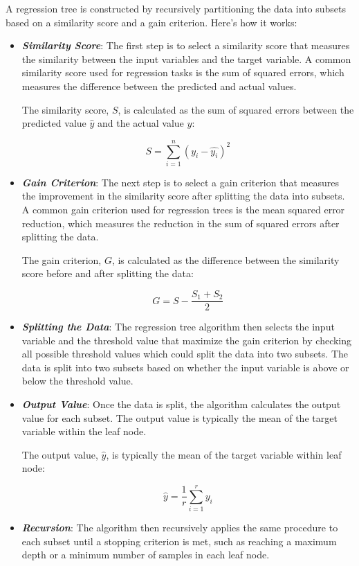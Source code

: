 \documentclass{article}
\begin{document}
\vspace{1em}
A regression tree is constructed by recursively partitioning the data into subsets based on a similarity score and a gain criterion. Here's how it works:

\begin{itemize}
	\item \textbf{\textit{Similarity Score}}: The first step is to select a similarity score that measures the similarity between the input variables and the target variable. A common similarity score used for regression tasks is the sum of squared errors, which measures the difference between the predicted and actual values.
	
	The similarity score, $S$, is calculated as the sum of squared errors between the predicted value $\hat{y}$ and the actual value $y$:
	
	$$ S = \sum_{i=1}^{n} ( y_i - \hat{y_i})^2 $$
	
	\item \textit{\textbf{Gain Criterion}}: The next step is to select a gain criterion that measures the improvement in the similarity score after splitting the data into subsets. A common gain criterion used for regression trees is the mean squared error reduction, which measures the reduction in the sum of squared errors after splitting the data.
	
	The gain criterion, $G$, is calculated as the difference between the similarity score before and after splitting the data:
	
	$$ G = S - \frac{S_1 + S_2}{2} $$
	
	\item \textit{\textbf{Splitting the Data}}: The regression tree algorithm then selects the input variable and the threshold value that maximize the gain criterion by checking all possible threshold values which could split the data into two subsets. The data is split into two subsets based on whether the input variable is above or below the threshold value.
	
	\item \textit{\textbf{Output Value}}: Once the data is split, the algorithm calculates the output value for each subset. The output value is typically the mean of the target variable within the leaf node.
	
	The output value, $\hat{y}$, is typically the mean of the target variable within leaf node:
	
	$$ \hat{y} = \frac{1}{r} \sum_{i=1}^{r} y_i $$
	
	\item\textit{\textbf{ Recursion}}: The algorithm then recursively applies the same procedure to each subset until a stopping criterion is met, such as reaching a maximum depth or a minimum number of samples in each leaf node. 
\end{itemize}
\end{document}

